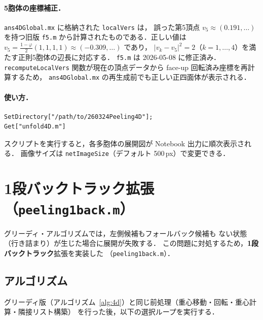 \documentclass[12pt,a4paper]{article}
\theoremstyle{definition}
\begin{document}
\paragraph{5胞体の座標補正．}
\texttt{ans4DGlobal.mx} に格納された \texttt{localVers} は，
誤った第5頂点 $v_5 \approx (0.191,\ldots)$ を持つ旧版 \texttt{f5.m}
から計算されたものである．正しい値は
$v_5 = \tfrac{1-\varphi}{2}(1,1,1,1) \approx (-0.309,\ldots)$ であり，
$|v_k - v_5|^2 = 2$（$k=1,\ldots,4$）を満たす正則5胞体の辺長に対応する．
\texttt{f5.m} は 2026-05-08 に修正済み．
\texttt{recomputeLocalVers} 関数が現在の頂点データから
face-up 回転済み座標を再計算するため，
\texttt{ans4DGlobal.mx} の再生成前でも正しい正四面体が表示される．

\paragraph{使い方．}
\begin{verbatim}
SetDirectory["/path/to/260324Peeling4D"];
Get["unfold4D.m"]
\end{verbatim}
スクリプトを実行すると，各多胞体の展開図が Notebook 出力に順次表示される．
画像サイズは \texttt{netImageSize}（デフォルト 500\,px）で変更できる．


\section{1段バックトラック拡張（\texttt{peeling1back.m}）}

グリーディ・アルゴリズムでは，左側候補もフォールバック候補も
ない状態（行き詰まり）が生じた場合に展開が失敗する．
この問題に対処するため，\textbf{1段バックトラック}拡張を実装した
（\texttt{peeling1back.m}）．

\subsection{アルゴリズム}

グリーディ版（アルゴリズム~\ref{alg:4d}）と同じ前処理（重心移動・回転・重心計算・隣接リスト構築）
を行った後，以下の選択ループを実行する．
\end{document}
